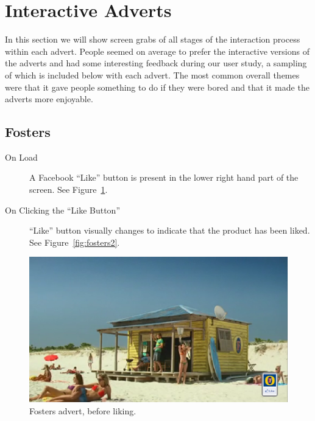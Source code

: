 \section{Interactive Adverts}
In this section we will show screen grabs of all stages of the interaction process within each advert. People seemed on average to prefer the interactive versions of the adverts and had some interesting feedback during our user study, a sampling of which is included below with each advert. The most common overall themes were that it gave people something to do if they were bored and that it made the adverts more enjoyable.

\subsection{Fosters}
	\begin{description}
		\item[On Load]{A Facebook ``Like'' button is present in the lower right hand part of the screen. See Figure~\ref{fig:fosters1}.}
		\item[On Clicking the ``Like Button'']{``Like'' button visually changes to indicate that the product has been liked. See Figure~\ref{fig:fosters2}.}
	\end{description}

	\begin{figure}[th]
		\centering
		\includegraphics[width=\textwidth,height=0.5\textheight,keepaspectratio]{images/adverts/fosters-1.png}
		\caption{Fosters advert, before liking.}
		\label{fig:fosters1}
	\end{figure}


